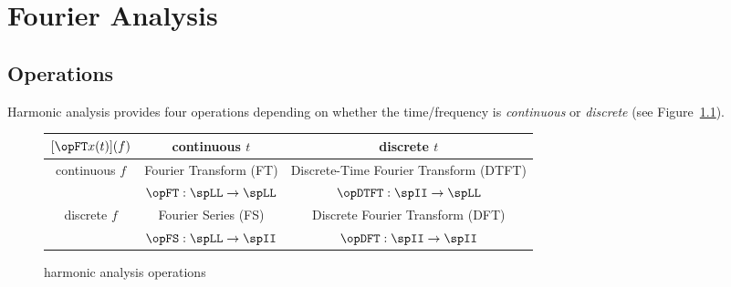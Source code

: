 
\chapter{Fourier Analysis}
\label{app:fourier}
\section{Operations}
Harmonic analysis provides four operations depending on 
whether the time/frequency is {\em continuous} or {\em discrete}
(see Figure~\ref{fig:fourier}).

\begin{figure}[h]
\begin{center}
   \begin{tabular}{|c||c|c|}
      \hline
      $[\opFT x(t)](f)$     &  continuous $t$      & discrete $t$   \\
      \hline
      \hline
         continuous $f$ & Fourier Transform (FT) & Discrete-Time Fourier Transform (DTFT) \\
                        & $\opFT:\spLL\to\spLL$    &  $\opDTFT:\spII\to\spLL$ \\
      \hline
         discrete   $f$ & Fourier Series (FS)  & Discrete Fourier Transform (DFT) \\
                        & $\opFS:\spLL\to\spII$  & $\opDFT:\spII\to\spII$ \\
      \hline
   \end{tabular}
\caption{
   harmonic analysis operations
   \label{fig:fourier}
   }
\end{center}
\end{figure}


